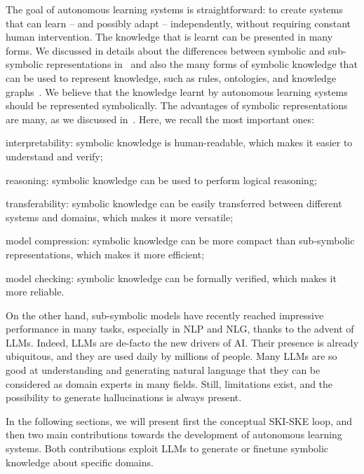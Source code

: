 %
The goal of autonomous learning systems is straightforward: to create systems that can learn -- and possibly adapt -- independently, without requiring constant human intervention.
%
The knowledge that is learnt can be presented in many forms.
%
We discussed in details about the differences between symbolic and sub-symbolic representations in~ and also the many forms of symbolic knowledge that can be used to represent knowledge, such as rules, ontologies, and knowledge graphs~.
%
We believe that the knowledge learnt by autonomous learning systems should be represented symbolically.
%
The advantages of symbolic representations are many, as we discussed in~.
%
Here, we recall the most important ones:
%
\begin{inlinelist}
    \item interpretability: symbolic knowledge is human-readable, which makes it easier to understand and verify;
    \item reasoning: symbolic knowledge can be used to perform logical reasoning;
    \item transferability: symbolic knowledge can be easily transferred between different systems and domains, which makes it more versatile;
    \item model compression: symbolic knowledge can be more compact than sub-symbolic representations, which makes it more efficient;
    \item model checking: symbolic knowledge can be formally verified, which makes it more reliable.
\end{inlinelist}


On the other hand, sub-symbolic models have recently reached impressive performance in many tasks, especially in \gls{NLP} and \gls{NLG}, thanks to the advent of \glspl{LLM}.
%
Indeed, \glspl{LLM} are de-facto the new drivers of \gls{AI}.
%
Their presence is already ubiquitous, and they are used daily by millions of people.
%
Many \glspl{LLM} are so good at understanding and generating natural language that they can be considered as domain experts in many fields.
%
Still, limitations exist, and the possibility to generate hallucinations is always present.


In the following sections, we will present first the conceptual \gls{SKI}-\gls{SKE} loop, and then two main contributions towards the development of autonomous learning systems.
%
Both contributions exploit \glspl{LLM} to generate or finetune symbolic knowledge about specific domains.


